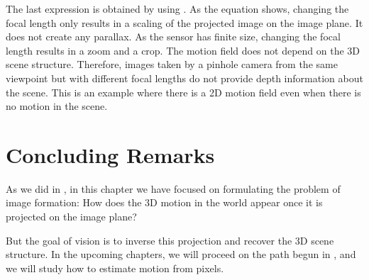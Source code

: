 The last expression is obtained by using \eqn{\ref{eq:pers_proj}}. As the equation shows, changing the focal length only results in a scaling of the projected image on the image plane. It does not create any parallax. As the sensor has finite size, changing the focal length results in a zoom and a crop. The motion field does not depend on the 3D scene structure. Therefore, images taken by a pinhole camera from the same viewpoint but with different focal lengths do not provide depth information about the scene. This is an example where there is a 2D motion field even when there is no motion in the scene.

\section{Concluding Remarks}

As we did in \chap{\ref{chapter:imaging}}, in this chapter we have focused on formulating the problem of image formation: How does the 3D motion in the world appear once it is projected on the image plane?

But the goal of vision is to inverse this projection and recover the 3D scene structure. In the upcoming chapters, we will proceed on the path begun in  \chap{\ref{chapter:motion_estimation}}, and we will study how to estimate motion from pixels.

